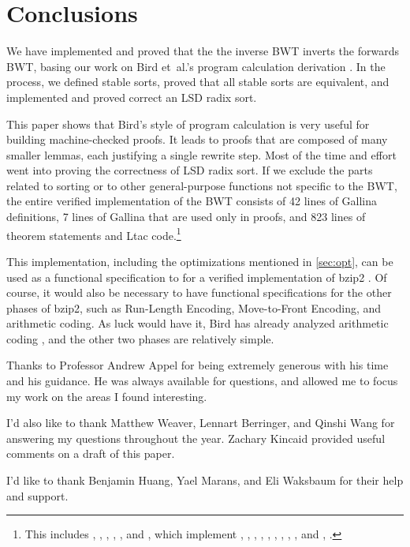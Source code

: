 \documentclass[sigplan,10pt,anonymous,review]{thesis}
\begin{document}
\section{Conclusions}
We have implemented and proved that the the inverse BWT inverts the
forwards BWT, basing our work on Bird et~al.'s program calculation
derivation \cite{birdmu,pearls}. In the process, we defined stable
sorts, proved that all stable sorts are equivalent, and implemented
and proved correct an LSD radix sort.

This paper shows that Bird's style of program calculation is very
useful for building machine-checked proofs. It leads to proofs that
are composed of many smaller lemmas, each justifying a single rewrite
step. Most of the time and effort went into proving the correctness of
LSD radix sort. If we exclude the parts related to sorting or to other
general-purpose functions not specific to the BWT, the entire verified
implementation of the BWT consists of 42 lines of Gallina definitions,
7 lines of Gallina that are used only in proofs, and 823 lines of
theorem statements and Ltac code.\footnote{This includes
  , , ,
  , ,  and
  , which implement , ,
  , , , , ,
  , , and , .}

This implementation, including the optimizations mentioned in
\cref{sec:opt}, can be used as a functional specification to for a
verified implementation of bzip2 \cite{tsai_2016}. Of course, it would
also be necessary to have functional specifications for the other
phases of bzip2, such as Run-Length Encoding, Move-to-Front Encoding,
and arithmetic coding. As luck would have it, Bird has already
analyzed arithmetic coding \cite{pearls}, and the other two phases are
relatively simple.

\begin{acks}
  Thanks to Professor Andrew Appel for being extremely generous with his
  time and his guidance. He was always available for questions, and
  allowed me to focus my work on the areas I found interesting.

  I'd also like to thank Matthew Weaver, Lennart Berringer, and Qinshi
  Wang for answering my questions throughout the year. Zachary Kincaid
  provided useful comments on a draft of this paper.

  I'd like to thank Benjamin Huang, Yael Marans, and Eli Waksbaum for
  their help and support.
\end{acks}
\end{document}
